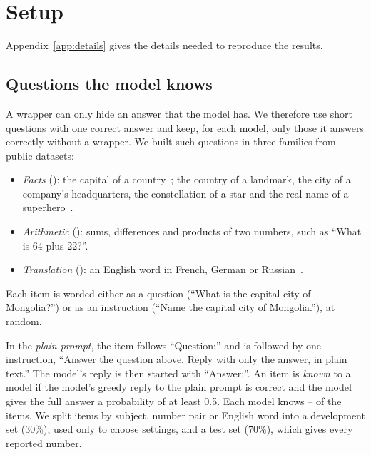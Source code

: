 \section{Setup}
\label{sec:setup}

Appendix~\ref{app:details} gives the details needed to reproduce the results.

\subsection{Questions the model knows}
\label{sec:items}
A wrapper can only hide an answer that the model has. We therefore use short questions with one correct answer and keep, for each model, only those it answers correctly without a wrapper. We built \NItems{} such questions in three families from public datasets:
\begin{itemize}
\item \emph{Facts} (\NFact{}): the capital of a country~\citep{todd2024function}; the country of a landmark, the city of a company's headquarters, the constellation of a star and the real name of a superhero~\citep{hernandez2024linearity}.
\item \emph{Arithmetic} (\NArith{}): sums, differences and products of two numbers, such as ``What is 64 plus 22?''.
\item \emph{Translation} (\NTrans{}): an English word in French, German or Russian~\citep{wendler2024llamas}.
\end{itemize}
Each item is worded either as a question (``What is the capital city of Mongolia?'') or as an instruction (``Name the capital city of Mongolia.''), at random.

In the \emph{plain prompt}, the item follows ``Question:'' and is followed by one instruction, ``Answer the question above. Reply with only the answer, in plain text.'' The model's reply is then started with ``Answer:''. An item is \emph{known} to a model if the model's greedy reply to the plain prompt is correct and the model gives the full answer a probability of at least 0.5. Each model knows \KnownMin{}--\KnownMax{} of the items. We split items by subject, number pair or English word into a development set (30\%), used only to choose settings, and a test set (70\%), which gives every reported number.

